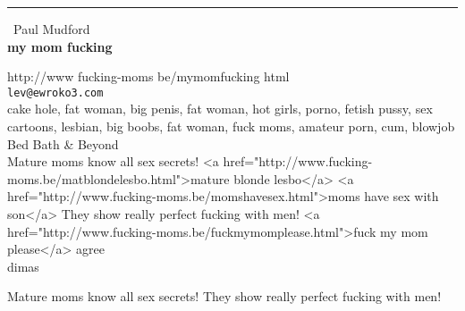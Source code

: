 \documentclass{report}
\begin{document}
\begin{center}
\rule{6in}{1pt} \
{\large Paul Mudford \\
{\bf my mom fucking}}

http://www fucking-moms be/mymomfucking html
\\
{\tt lev@ewroko3.com}\\
cake hole, fat woman, big penis, fat woman, hot girls, porno, fetish pussy, sex cartoons, lesbian, big boobs, fat woman, fuck moms, amateur porn, cum, blowjob Bed Bath & Beyond\\
Mature moms know all sex secrets! 
<a href="http://www.fucking-moms.be/matblondelesbo.html">mature blonde lesbo</a>
<a href="http://www.fucking-moms.be/momshavesex.html">moms have sex with son</a>
They show really perfect fucking with men!
<a href="http://www.fucking-moms.be/fuckmymomplease.html">fuck my mom please</a> agree\\
	dimas\end{center}

Mature moms know all sex secrets! They show really perfect fucking with men!
\end{document}
